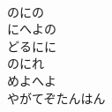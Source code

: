 \documentclass[10pt,b5j]{tarticle} %
\begin{document}
\begin{enumerate}
\begin{minipage}[c]{\blocksize}
    \end{minipage}
    \begin{minipage}[c]{\blocksize}
        
        \vspace{\linespace}
        \item~\\
        のにの\\
        にへよの\\
        どるにに\\
        のにれ\\
        めよへよ\\
        やがてぞたんはん
    
    \end{minipage}
\end{enumerate} %
\end{document}
